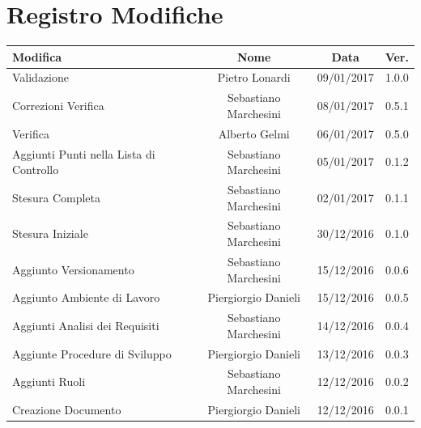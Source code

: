 \documentclass[12pt,a4paper,titlepage]{article}
\begin{document}
	
	
	\clearpage %
	

\chead{}
\cfoot{}
\rfoot{\thepage}
\renewcommand{\headrulewidth}{0.2pt}
\renewcommand{\footrulewidth}{0.2pt}

\section{Registro Modifiche}
\small %

{\renewcommand\arraystretch{1.2}  %
	\begin{tabular}{|l|c|c|c|}
			\hline
			{\textbf{Modifica}}&{\textbf{Nome}}&{\textbf{Data}}&{\textbf{Ver.}}\\
			\hline
			Validazione & Pietro Lonardi & 09/01/2017 & 1.0.0 \\
			\hline
			Correzioni Verifica & Sebastiano Marchesini & 08/01/2017 & 0.5.1 \\
			\hline
			Verifica & Alberto Gelmi & 06/01/2017 & 0.5.0 \\
			\hline
			Aggiunti Punti nella Lista di Controllo & Sebastiano Marchesini & 05/01/2017 & 0.1.2\\
			\hline
			Stesura Completa & Sebastiano Marchesini & 02/01/2017 & 0.1.1\\
			\hline
			Stesura Iniziale & Sebastiano Marchesini & 30/12/2016 & 0.1.0\\
			\hline
			Aggiunto Versionamento & Sebastiano Marchesini & 15/12/2016 & 0.0.6\\
			\hline
			Aggiunto Ambiente di Lavoro & Piergiorgio Danieli & 15/12/2016 & 0.0.5\\
			\hline
			Aggiunti Analisi dei Requisiti & Sebastiano Marchesini & 14/12/2016 & 0.0.4\\
			\hline
			Aggiunte Procedure di Sviluppo & Piergiorgio Danieli & 13/12/2016 & 0.0.3\\
			\hline
			Aggiunti Ruoli & Sebastiano Marchesini & 12/12/2016 & 0.0.2\\
			\hline
			Creazione Documento & Piergiorgio Danieli & 12/12/2016 & 0.0.1\\
			\hline
	\end{tabular}
}
\normalsize	%
\newpage
\end{document}
